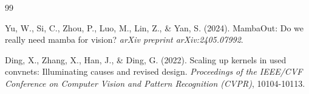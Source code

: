 \documentclass[10pt, a4paper, twocolumn]{article}
\begin{document}
\begin{thebibliography}{99}

Yu, W., Si, C., Zhou, P., Luo, M., Lin, Z., \& Yan, S. (2024). MambaOut: Do we really need mamba for vision? \textit{arXiv preprint arXiv:2405.07992}.




Ding, X., Zhang, X., Han, J., \& Ding, G. (2022). Scaling up kernels in used convnets: Illuminating causes and revised design. \textit{Proceedings of the IEEE/CVF Conference on Computer Vision and Pattern Recognition (CVPR)}, 10104-10113. 


\end{thebibliography}
\end{document}
